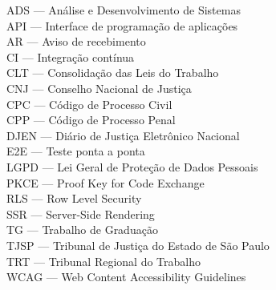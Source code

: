 \documentclass[12pt,a4paper,oneside]{report}
\renewcommand{\headrulewidth}{0pt}
\begin{document}
\begin{singlespace}\noindent
ADS --- Análise e Desenvolvimento de Sistemas\\
API --- Interface de programação de aplicações\\
AR --- Aviso de recebimento\\
CI --- Integração contínua\\
CLT --- Consolidação das Leis do Trabalho\\
CNJ --- Conselho Nacional de Justiça\\
CPC --- Código de Processo Civil\\
CPP --- Código de Processo Penal\\
DJEN --- Diário de Justiça Eletrônico Nacional\\
E2E --- Teste ponta a ponta\\
LGPD --- Lei Geral de Proteção de Dados Pessoais\\
PKCE --- Proof Key for Code Exchange\\
RLS --- Row Level Security\\
SSR --- Server-Side Rendering\\
TG --- Trabalho de Graduação\\
TJSP --- Tribunal de Justiça do Estado de São Paulo\\
TRT --- Tribunal Regional do Trabalho\\
WCAG --- Web Content Accessibility Guidelines
\end{singlespace}
\clearpage\tableofcontents\thispagestyle{empty}
\clearpage\pagestyle{fancy}
\fancypagestyle{plain}{\fancyhf{}\fancyhead[R]{\fontsize{10}{12}\selectfont\thepage}\renewcommand{\headrulewidth}{0pt}}








\appendix
{}






\end{document}
